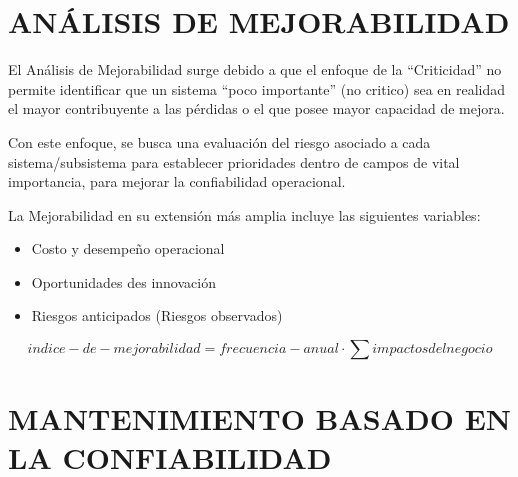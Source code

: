 \documentclass[a5paper]{book}%
\begin{document}
  \section{ANÁLISIS DE MEJORABILIDAD}

  El Análisis de Mejorabilidad surge debido a que el enfoque de la “Criticidad” no permite identificar que un sistema “poco importante” (no critico) sea en realidad el mayor contribuyente a las pérdidas o el que posee mayor capacidad de mejora.

Con este enfoque, se busca una evaluación del riesgo asociado a cada sistema/subsistema para establecer prioridades dentro de campos de vital importancia, para mejorar la confiabilidad operacional.

La Mejorabilidad en su extensión más amplia incluye las siguientes variables:

\begin{itemize}
\item Costo y desempeño operacional
\item Oportunidades des innovación
\item Riesgos anticipados (Riesgos observados)
\end{itemize}

\[ indice-de-mejorabilidad = frecuencia-anual \cdot \sum impactos del negocio\]


\section{MANTENIMIENTO BASADO EN LA CONFIABILIDAD}


%
%
\printbibliography
\end{document}
